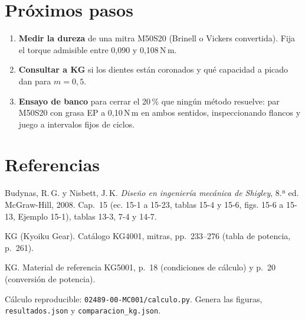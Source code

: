 \documentclass[11pt,a4paper]{article}
\newcommand{\Nm}{\,N\,m\xspace}
\begin{document}
\section{Próximos pasos}
\begin{enumerate}[leftmargin=1.4em]
  \item \textbf{Medir la dureza} de una mitra M50S20 (Brinell o Vickers convertida). Fija el torque admisible entre 0,090 y 0,108\Nm.
  \item \textbf{Consultar a KG} si los dientes están coronados y qué capacidad a picado dan para $m=0{,}5$.
  \item \textbf{Ensayo de banco} para cerrar el 20\,\% que ningún método resuelve: par M50S20 con grasa EP a 0,10\Nm en ambos
        sentidos, inspeccionando flancos y juego a intervalos fijos de ciclos.
\end{enumerate}

\section{Referencias}
\begin{enumerate}[label={[\arabic*]}, leftmargin=2em]
  \item Budynas, R.\,G. y Nisbett, J.\,K. \emph{Diseño en ingeniería mecánica de Shigley}, 8.ª ed. McGraw-Hill, 2008.
        Cap.~15 (ec. 15-1 a 15-23, tablas 15-4 y 15-6, figs. 15-6 a 15-13, Ejemplo 15-1), tablas 13-3, 7-4 y 14-7.
  \item KG (Kyoiku Gear). Catálogo KG4001, mitras, pp.~233--276 (tabla de potencia, p.~261).
  \item KG. Material de referencia KG5001, p.~18 (condiciones de cálculo) y p.~20 (conversión de potencia).
\end{enumerate}

Cálculo reproducible: \texttt{02489-00-MC001/calculo.py}. Genera las figuras, \texttt{resultados.json} y \texttt{comparacion\_kg.json}.
\end{document}
